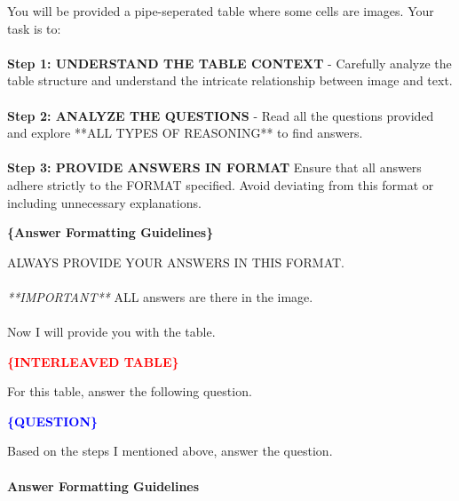 \documentclass[11pt]{article}
\newcommand{\varred}[1]{\textcolor{red}{\textbf{#1}}}
\newcommand{\varblue}[1]{\textcolor{blue}{\textbf{#1}}}
\newcommand{\vargreen}[1]{\textcolor{olivegreen}{\textbf{#1}}}
\begin{document}
\begin{tcolorbox}[breakable,colback=lightestgray,colframe=black,title=\centering\textbf{Interleaved Baseline Prompt}]

You will be provided a pipe-seperated table where some cells are images.
Your task is to:\\\\

\textbf{Step 1: UNDERSTAND THE TABLE CONTEXT} -
Carefully analyze the table structure and understand the intricate relationship between image and text.\\\\

\textbf{Step 2: ANALYZE THE QUESTIONS} -
Read all the questions provided and explore **ALL TYPES OF REASONING** to find answers.\\\\

\textbf{Step 3: PROVIDE ANSWERS IN FORMAT
}
Ensure that all answers adhere strictly to the FORMAT specified. Avoid deviating from this format or including unnecessary explanations.

\textbf{\vargreen{\{Answer Formatting Guidelines\}}}

ALWAYS PROVIDE YOUR ANSWERS IN THIS FORMAT.\\\\

\textit{**IMPORTANT**} ALL answers are there in the image.\\\\

Now I will provide you with the table.

\textbf{\varred{\{INTERLEAVED TABLE\}}}

For this table, answer the following question.

\textbf{\varblue{\{QUESTION\}}}

Based on the steps I mentioned above, answer the question.
\end{tcolorbox}

\paragraph{Answer Formatting Guidelines}
\end{document}
